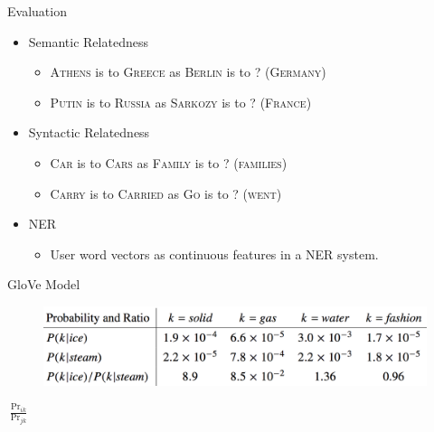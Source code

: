 \begin{frame}{Evaluation}
  \begin{itemize}
  \item Semantic Relatedness %
    \begin{itemize}
    \item \textsc{Athens} is to \textsc{Greece} as \textsc{Berlin} is to ? (\textsc{Germany})
    \item \textsc{Putin} is to \textsc{Russia} as \textsc{Sarkozy} is to ? (\textsc{France})
    \end{itemize}
  \item Syntactic Relatedness %
    \begin{itemize}
    \item \textsc{Car} is to \textsc{Cars} as \textsc{Family} is to ? (\textsc{families})
    \item \textsc{Carry} is to \textsc{Carried} as \textsc{Go} is to ? (\textsc{went})
    \end{itemize}
  \item NER 
    \begin{itemize}
    \item User word vectors as continuous features in a NER system.
    \end{itemize}
  \end{itemize}
\end{frame}


\begin{frame}{GloVe Model}
  \begin{figure}
    \includegraphics[scale=0.23]{images/glove_int.png}
  \end{figure}
  $\frac{\Pr_{ik}}{\Pr_{jk}}$
\end{frame}

